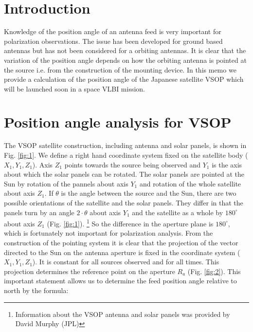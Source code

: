 \maketitle
\vspace{5mm}
\section{Introduction}
Knowledge of the position angle of an antenna feed is very important for polarization observations. The issue has been developed for ground based antennas but has not been considered for a orbiting antennas. It is clear that the variation  of the position angle depends on how the orbiting antenna is pointed at the source i.e. from the construction of the mounting device. In this memo we provide a calculation of the position angle of the Japanese satellite VSOP which will be launched soon in a space VLBI mission.
\section{Position angle analysis for VSOP}
The VSOP satellite construction, including antenna and solar panels, is shown in Fig. \ref{fig:1}.   We define a right hand coordinate system fixed on the satellite body ($X_1, Y_1, Z_1$). Axis $Z_1$ points towards the source being observed and  $Y_1$ is the axis about which the solar panels can be rotated. The solar panels are pointed at the Sun by rotation of the pannels about axis $Y_1$ and rotation of the whole satellite about axis $Z_1$. If $\theta$ is the angle between the source and the Sun, there are two possible orientations of the satellite and the solar panels. They differ in that the panels turn by an angle $2 \cdot \theta$ about axis $Y_1$ and the satellite as a whole by $180^{\circ}$ about axis $Z_1$ (Fig. \ref{fig:1}).
\footnote {Information about the VSOP antenna and solar panels was provided by David Murphy (JPL)} So the difference in the aperture plane is  $180^\circ$, which is fortunately not important for polarization analysis. From the construction of the pointing system it is clear that the projection of the vector directed to the Sun on the antenna aperture is fixed in the coordinate system ($X_1, Y_1, Z_1$).
It is constant for all sources observed and for all times. This projection determines the reference point on the aperture $R_a$ (Fig. \ref{fig:2}). This important statement allows us to determine the feed position angle relative to north by the formula:


